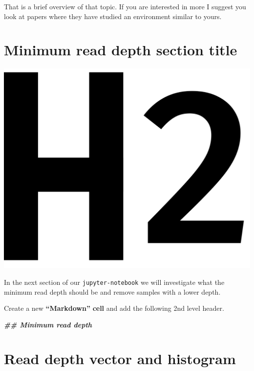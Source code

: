 \documentclass[
]{book}
\newenvironment{Shaded}{\begin{snugshade}}{\end{snugshade}}
\newcommand{\DocumentationTok}[1]{\textcolor[rgb]{0.56,0.35,0.01}{\textbf{\textit{#1}}}}
\begin{document}
That is a brief overview of that topic. If you are interested in more I suggest you look at papers where they have studied an environment similar to yours.

\hypertarget{minimum-read-depth-section-title}{%
\section{Minimum read depth section title}\label{minimum-read-depth-section-title}}

\includegraphics{figures/header_l2.png}

In the next section of our \texttt{jupyter-notebook} we will investigate what the minimum read depth should be and remove samples with a lower depth.

Create a new \textbf{``Markdown''} \textbf{cell} and add the following 2nd level header.

\begin{Shaded}
\begin{Highlighting}[]
\DocumentationTok{\#\# Minimum read depth}
\end{Highlighting}
\end{Shaded}

\hypertarget{read-depth-vector-and-histogram}{%
\section{Read depth vector and histogram}\label{read-depth-vector-and-histogram}}
\end{document}
